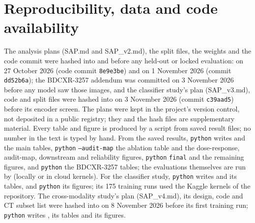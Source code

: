 \section{Reproducibility, data and code availability}
\label{sec:repro}
The analysis plans (SAP.md and SAP\_v2.md), the split files, the weights and the code commit were hashed into  and
 before any held-out or locked evaluation:  on 27 October 2026 (code commit \texttt{8e9e3be}) and
 on 1 November 2026 (commit \texttt{dd52b6a}); the BDCXR-3257 addendum was committed on 3 November 2026 before any model
saw those images, and the classifier study's plan (SAP\_v3.md), code and split files were hashed into  on 3 November
2026 (commit \texttt{c39aad5}) before its encoder screen. The plans were kept in the project's version control, not deposited in a public registry; they and the hash files are
supplementary material. Every table and figure is produced by a script from saved result files; no number in the text is typed by hand. From the saved
results, \texttt{python}  writes  and the main tables, \texttt{python}  \texttt{--audit-map} the ablation table and the dose-response, audit-map, downstream and reliability figures, \texttt{python}  \texttt{final}
and  the remaining figures, and \texttt{python}  the BDCXR-3257 tables; the
evaluations themselves are run by  (locally or in cloud kernels). For the classifier study,
\texttt{python}  writes  and its tables, and
\texttt{python}  its figures; its 175 training runs used the Kaggle kernels of the repository.
The cross-modality study's plan (SAP\_v4.md), its design, code and CT subset list were hashed into  on 8 November 2026
before its first training run; \texttt{python}  writes , 
its tables and  its figures. 

